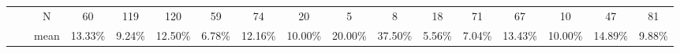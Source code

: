 \documentclass{sigchi}
\begin{document}
\begin{table}[t]
\begin{adjustbox}{width=1\textwidth}
\begin{tabular}{ccccccccccccccccc}
			\multicolumn{1}{|c|}{}                               & \multicolumn{1}{c|}{}                        & \multicolumn{1}{c|}{N}     & \multicolumn{1}{c|}{60}                                   & \multicolumn{1}{c|}{119}                                 & \multicolumn{1}{c|}{120}                                  & \multicolumn{1}{c|}{59}                                  & \multicolumn{1}{c|}{74}                                        & \multicolumn{1}{c|}{20}                                     & \multicolumn{1}{c|}{5}                                & \multicolumn{1}{c|}{8}                               & \multicolumn{1}{c|}{18}                              & \multicolumn{1}{c|}{71}                              & \multicolumn{1}{c|}{67}                              & \multicolumn{1}{c|}{10}                              & \multicolumn{1}{c|}{47}                                   & \multicolumn{1}{c|}{81}                                  \\ \cline{3-17} 
			\multicolumn{1}{|c|}{}                               & \multicolumn{1}{c|}{}                        & \multicolumn{1}{c|}{mean}  & \multicolumn{1}{c|}{13.33\%}                              & \multicolumn{1}{c|}{9.24\%}                              & \multicolumn{1}{c|}{12.50\%}                              & \multicolumn{1}{c|}{6.78\%}                              & \multicolumn{1}{c|}{12.16\%}                                   & \multicolumn{1}{c|}{10.00\%}                                & \multicolumn{1}{c|}{20.00\%}                          & \multicolumn{1}{c|}{37.50\%}                         & \multicolumn{1}{c|}{5.56\%}                          & \multicolumn{1}{c|}{7.04\%}                          & \multicolumn{1}{c|}{13.43\%}                         & \multicolumn{1}{c|}{10.00\%}                         & \multicolumn{1}{c|}{14.89\%}                              & \multicolumn{1}{c|}{9.88\%}                              \\ \cline{3-17} 

\end{tabular}
\end{adjustbox}
\end{table}
\end{document}
